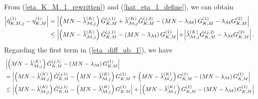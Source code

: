 \documentclass[11pt, draftclsnofoot, onecolumn]{IEEEtran}
\begin{document}
\begin{IEEEproof}
From (\ref{eta_K_M_1_rewritten}) and (\ref{hat_eta_1_define}), we can obtain
\begin{align} \notag
\left| {\hat \eta _{K,M,j}^{(1)} - \eta _{K,M}^{(1)}} \right| 
& = \left| {\left( {MN - \hat \lambda _{{\cal M},j}^{(K)}} \right)\hat G_{K,M}^{(j,1)} + \hat \lambda _{{\cal M},j}^{(K)}\hat G_{K,M}^{(j,2)} - \left( {MN - {\lambda _{\cal M}}} \right)G_{K,M}^{(1)} - {\lambda _{\cal M}}G_{K,M}^{(2)}} \right|\\ \label{eta_diff_ub_1}
& \le \left| {\left( {MN - \hat \lambda _{{\cal M},j}^{(K)}} \right)\hat G_{K,M}^{(j,1)} - \left( {MN - {\lambda _{\cal M}}} \right)G_{K,M}^{(1)}} \right| \! + \! \left| {\hat \lambda _{{\cal M},j}^{(K)}\hat G_{K,M}^{(j,2)} - {\lambda _{\cal M}}G_{K,M}^{(2)}} \right|.
\end{align}
Regarding the first term in (\ref{eta_diff_ub_1}), we have
\begin{align} \notag
& \left| {\left( {MN - \hat \lambda _{{\cal M},j}^{(K)}} \right)\hat G_{K,M}^{(j,1)} - \left( {MN - {\lambda _{\cal M}}} \right)G_{K,M}^{(1)}} \right|\\ \notag
& = \left| {\left( {MN - \hat \lambda _{{\cal M},j}^{(K)}} \right)\hat G_{K,M}^{(j,1)} - \left( {MN - \hat \lambda _{{\cal M},j}^{(K)}} \right)G_{K,M}^{(1)} + \left( {MN - \hat \lambda _{{\cal M},j}^{(K)}} \right)G_{K,M}^{(1)} - \left( {MN - {\lambda _{\cal M}}} \right)G_{K,M}^{(1)}} \right|\\ \notag
& \le \left| {\left( {MN - \hat \lambda _{{\cal M},j}^{(K)}} \right)\hat G_{K,M}^{(j,1)} - \left( {MN - \hat \lambda _{{\cal M},j}^{(K)}} \right)G_{K,M}^{(1)}} \right| + \left| {\left( {MN - \hat \lambda _{{\cal M},j}^{(K)}} \right)G_{K,M}^{(1)} - \left( {MN - {\lambda _{\cal M}}} \right)G_{K,M}^{(1)}} \right|\\ \label{eta_diff_1st_term_ub_1}

\end{align}
\end{IEEEproof}
\end{document}
